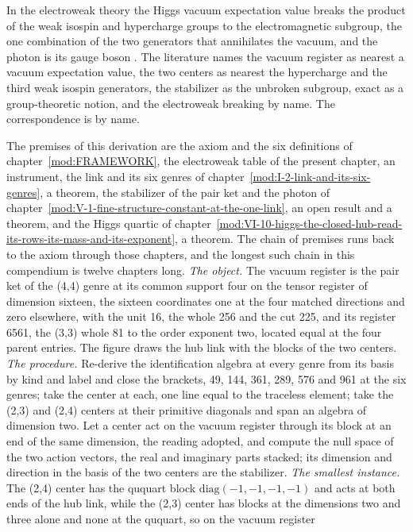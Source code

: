 \begin{chbridge}In the electroweak theory the Higgs vacuum expectation value breaks the product of the weak isospin and hypercharge groups to the electromagnetic subgroup, the one combination of the two generators that annihilates the vacuum, and the photon is its gauge boson \cite{Weinberg1967,Peskin1995}. The literature names the vacuum register as nearest a vacuum expectation value, the two centers as nearest the hypercharge and the third weak isospin generators, the stabilizer as the unbroken subgroup, exact as a group-theoretic notion, and the electroweak breaking by name. The correspondence is by name.\end{chbridge}
\begin{chproof}
The premises of this derivation are the axiom and the six definitions of chapter~\ref{mod:FRAMEWORK}, the electroweak table of the present chapter, an instrument, the link and its six genres of chapter~\ref{mod:I-2-link-and-its-six-genres}, a theorem, the stabilizer of the pair ket and the photon of chapter~\ref{mod:V-1-fine-structure-constant-at-the-one-link}, an open result and a theorem, and the Higgs quartic of chapter~\ref{mod:VI-10-higgs-the-closed-hub-read-its-rows-its-mass-and-its-exponent}, a theorem. The chain of premises runs back to the axiom through those chapters, and the longest such chain in this compendium is twelve chapters long.
\textit{The object.} The vacuum register is the pair ket of the (4,4) genre at its common support four on the tensor register of dimension sixteen, the sixteen coordinates one at the four matched directions and zero elsewhere, with the unit 16, the whole 256 and the cut 225, and its register 6561, the (3,3) whole 81 to the order exponent two, located equal at the four parent entries. The figure draws the hub link with the blocks of the two centers.
\textit{The procedure.} Re-derive the identification algebra at every genre from its basis by kind and label and close the brackets, 49, 144, 361, 289, 576 and 961 at the six genres; take the center at each, one line equal to the traceless element; take the (2,3) and (2,4) centers at their primitive diagonals and span an algebra of dimension two. Let a center act on the vacuum register through its block at an end of the same dimension, the reading adopted, and compute the null space of the two action vectors, the real and imaginary parts stacked; its dimension and direction in the basis of the two centers are the stabilizer.
\textit{The smallest instance.} The (2,4) center has the ququart block $\mathrm{diag}(-1,-1,-1,-1)$ and acts at both ends of the hub link, while the (2,3) center has blocks at the dimensions two and three alone and none at the ququart, so on the vacuum register

\end{chproof}
